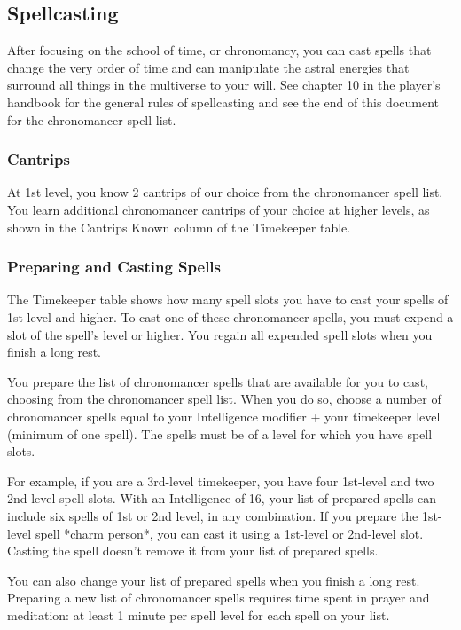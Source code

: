 \subsection{Spellcasting}

After focusing on the school of time, or chronomancy, you can cast spells that change the very order of time and can manipulate the astral energies that surround all things in the multiverse to your will. See chapter 10 in the player's handbook for the general rules of spellcasting and see the end of this document for the chronomancer spell list.

\subsubsection{Cantrips}

At 1st level, you know 2 cantrips of our choice from the chronomancer spell list. You learn additional chronomancer cantrips of your choice at higher levels, as shown in the Cantrips Known column of the Timekeeper table.

\subsubsection{Preparing and Casting Spells}

The Timekeeper table shows how many spell slots you have to cast your spells of 1st level and higher. To cast one of these chronomancer spells, you must expend a slot of the spell's level or higher. You regain all expended spell slots when you finish a long rest.

You prepare the list of chronomancer spells that are available for you to cast, choosing from the chronomancer spell list. When you do so, choose a number of chronomancer spells equal to your Intelligence modifier + your timekeeper level (minimum of one spell). The spells must be of a level for which you have spell slots.

For example, if you are a 3rd-level timekeeper, you have four 1st-level and two 2nd-level spell slots. With an Intelligence of 16, your list of prepared spells can include six spells of 1st or 2nd level, in any combination. If you prepare the 1st-level spell *charm person*, you can cast it using a 1st-level or 2nd-level slot. Casting the spell doesn't remove it from your list of prepared spells.

You can also change your list of prepared spells when you finish a long rest. Preparing a new list of chronomancer spells requires time spent in prayer and meditation: at least 1 minute per spell level for each spell on your list.

